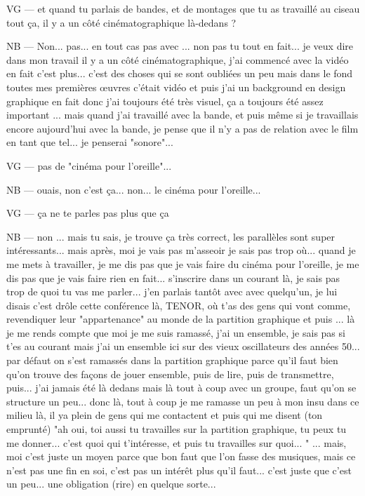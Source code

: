 VG — et quand tu parlais de bandes, et de montages que tu as travaillé au ciseau tout ça, il y a un côté cinématographique là-dedans ?

NB — Non... pas... en tout cas pas avec ... non pas tu tout en fait...  je veux dire dans mon travail il y a un côté cinématographique, j'ai commencé avec la vidéo en fait c'est plus... c'est des choses qui se sont oubliées un peu mais dans le fond toutes mes premières œuvres c'était vidéo et puis j'ai un background en design graphique en fait donc j'ai toujours été très visuel, ça a toujours été  assez important ... mais quand j'ai travaillé avec la bande, et puis même si je travaillais encore aujourd'hui avec la bande, je pense que il n'y a pas de relation avec le film en tant que tel... je penserai "sonore"...

VG — pas de "cinéma pour l'oreille"... 

NB — ouais, non c'est ça... non... le cinéma pour l'oreille... 

VG — ça ne te parles pas plus que ça 

NB — non ... mais tu sais, je trouve ça très correct, les parallèles sont super intéressants... mais après, moi je vais pas m'asseoir je sais pas trop où... quand je me mets à travailler, je me dis pas que je vais faire du cinéma pour l'oreille, je me dis pas que je vais faire rien en fait... s'inscrire dans un courant là, je sais pas trop de quoi tu vas me parler...  j'en parlais tantôt avec avec quelqu'un, je lui disais c'est drôle cette conférence là, TENOR, où t'as des gens qui vont comme, revendiquer leur "appartenance" au monde de la partition graphique et puis ... là je me rends compte que moi je me suis ramassé, j'ai un ensemble, je sais pas si t'es au courant mais j'ai un ensemble ici sur des vieux oscillateurs des années 50... par défaut on s'est ramassés dans la partition graphique parce qu'il faut bien qu'on trouve des façons de jouer ensemble, puis de lire, puis de transmettre, puis... j'ai jamais été là dedans mais là tout à coup avec un groupe, faut qu'on se structure un peu... donc là, tout à coup je me ramasse un peu à mon insu dans ce milieu là, il ya plein de gens qui me contactent et puis qui me disent (ton emprunté) "ah oui, toi aussi tu travailles sur la partition graphique, tu peux tu me donner... c'est quoi qui t'intéresse, et puis tu travailles sur quoi... " ... mais, moi c'est juste un moyen parce que bon faut que l'on fasse des musiques, mais ce n'est pas une fin en soi, c'est pas un intérêt plus qu'il faut... c'est juste que c'est un peu... une obligation (rire) en quelque sorte...

